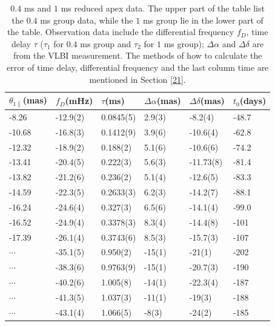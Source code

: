 \documentclass[useAMS,usenatbib]{mn2e}
\begin{document}
\begin{table}
\centering
\begin{tabular}{llllll}
\hline
$\theta_{1\parallel}$(mas) & $f_D$(mHz) & $\tau$(ms)  & $\Delta\alpha$(mas) & $\Delta\delta$(mas) & $t_0$(days)\\
\hline
 -8.26   & -12.9(2)      & 0.0845(5) & 2.9(3)  & -8.2(4)      & -48.7                                \\
-10.68   &-16.8(3)      & 0.1412(9)  & 3.9(6) & -10.6(4)      &-62.8                                \\
-12.32   &-18.9(2)      & 0.188(2)   & 5.1(6) & -10.6(6)      &-74.2                        \\
-13.41 & -20.4(5)      & 0.222(3)     & 5.6(3)  & -11.73(8)    &-81.4                                \\
-13.82 &-21.2(6)        & 0.236(2)    & 5.1(4)  & -12.6(5)      &-83.3                                \\
-14.59   &-22.3(5)      & 0.2633(3)    & 6.2(3)  & -14.2(7)     &-88.1                                \\
-16.24   &-24.6(4)       & 0.327(3)   & 6.5(6)  & -14.1(4)       &-99.0                                \\
-16.52  &-24.9(4)      & 0.3378(3)         & 8.3(4)  & -14.4(8)      &-101                                \\
-17.39   &-26.1(4)    & 0.3743(6)         & 8.5(3)    & -15.7(3)      &-107                               
\\ \hline
$\cdots$&         -35.1(5)  & 0.950(2)   & -15(1)  & -21(1)   &-202                                   \\
$\cdots$ & -38.3(6)  & 0.9763(9)   & -15(1)       & -20.7(3)  &-190                                    \\
$\cdots$ & -40.2(6)  & 1.005(8)    & -14(1)       & -22.3(4)  &-187                                   \\
$\cdots$ & -41.3(5)    & 1.037(3)   & -11(1)     & -19(3)   &-188                                   \\
$ \cdots$ & -43.1(4)      & 1.066(5)    & -8(3)     & -24(2)   &-185   \\
 \hline                                 
\end{tabular}
\caption{ $0.4$ ms and $1$ ms reduced apex data. 
The upper part of the table list the $0.4$ ms group data, while the $1$ ms group lie in the lower part of the table. 
Observation data include the differential frequency $f_D$, time delay $\tau$ ($\tau_1$ for $0.4$ ms group and $\tau_2$ for $1$ ms group); $\Delta\alpha$ and $\Delta\delta$ are from the VLBI measurement. The methods of how to calculate the error of time delay, differential frequency and the last column time are mentioned in Section \ref{21}.}
\label{table:apex}
\end{table}
\end{document}

